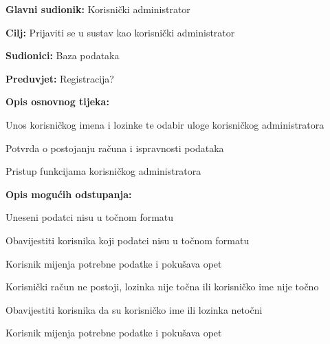 				\noindent {}
				\begin{packed_item}
					
					\item \textbf{Glavni sudionik: }Korisnički administrator
					\item  \textbf{Cilj:} Prijaviti se u sustav kao korisnički administrator
					\item  \textbf{Sudionici:} Baza podataka
					\item  \textbf{Preduvjet:} Registracija?
					\item  \textbf{Opis osnovnog tijeka:}
					
					\item[] \begin{packed_enum}
						
						\item Unos korisničkog imena i lozinke te odabir uloge korisničkog administratora
						\item Potvrda o postojanju računa i ispravnosti podataka
						\item Pristup funkcijama korisničkog administratora
					\end{packed_enum}
					
					\item  \textbf{Opis mogućih odstupanja:}
					
					\item[] \begin{packed_item}
						
						\item[2.a] Uneseni podatci nisu u točnom formatu
						\item[] \begin{packed_enum}
							
							\item Obavijestiti korisnika koji podatci nisu u točnom formatu
							\item Korisnik mijenja potrebne podatke i pokušava opet
							
						\end{packed_enum}
						\item[2.b] Korisnički račun ne postoji, lozinka nije točna ili korisničko ime nije točno
						\item[] \begin{packed_enum}
							
							\item Obavijestiti korisnika da su korisničko ime ili lozinka netočni
							\item Korisnik mijenja potrebne podatke i pokušava opet
							
						\end{packed_enum}
						
						
					\end{packed_item}
				\end{packed_item}
				
